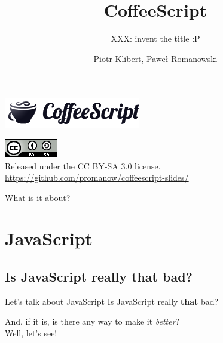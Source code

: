 \documentclass[xcolor=dvipsnames]{beamer}
\title{CoffeeScript}
\subtitle{XXX: invent the title :P}
\author{Piotr Klibert, Paweł Romanowski}
\begin{document}
\begin{frame}[plain]
    \begin{center}
        \includegraphics[scale=0.25]{img/logo.png}
    \end{center}

    \titlepage

    \begin{center}
        \includegraphics[scale=0.5]{img/cc.png} \\
        Released under the CC BY-SA 3.0 license. \\
        \vspace{0.5cm}
        \url{https://github.com/promanow/coffeescript-slides/}
    \end{center}

\end{frame}

\begin{frame}{What is it about?}
    \tableofcontents
\end{frame}



\section{JavaScript}

\subsection{Is JavaScript really that bad?}
\begin{frame}[fragile]{Let's talk about JavaScript}
    Is JavaScript really \textbf{that} bad? \\
    \pause
    
    \vspace{1cm}
    And, if it is, is there any way to make it \emph{better}? \\

    \vspace{1cm}
    Well, let's see!
\end{frame}
\end{document}
